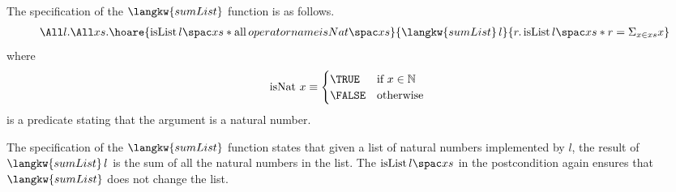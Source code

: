 The specification of the $\langkw{sumList}$ function is as follows.
\begin{align*}
\All l. \All xs.
  \hoare{ \isList {l} {xs} \ast \all {operatorname{isNat}} {xs}}{\langkw{sumList} \, l}{r.  \isList {l} {xs} \ast r = \Sigma_{x \in xs} x}
\end{align*}
where 
\begin{align*}
\operatorname{isNat} \, x &\equiv \begin{cases} \TRUE & \text{if } x \in \mathbb{N} \\
																			\FALSE & \text{otherwise } \end{cases}
\end{align*}
is a predicate stating that the argument is a natural number.

The specification of the $\langkw{sumList}$ function states that given a list of natural numbers implemented by $l$, the result of $\langkw{sumList}\,l$ is the sum of all the natural numbers in the list.
The $\isList {l} {xs}$ in the postcondition again ensures that $\langkw{sumList}$ does not change the list.

